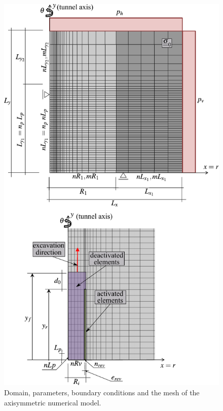\documentclass[Journal,letterpaper]{ascelike-new}
\begin{document}
\begin{figure}
	\centering
	\includegraphics[scale = 1.0]{FIG5.pdf}
	\caption{\label{malhaAXI}Domain, parameters, boundary conditions and the mesh of the axisymmetric numerical model.}
\end{figure}
\end{document}
